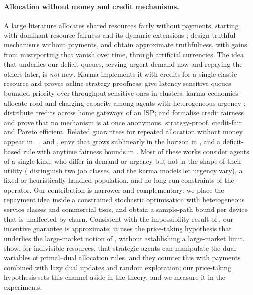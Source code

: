 \paragraph{Allocation without money and credit mechanisms.}
A large literature allocates shared resources fairly without payments, starting with dominant resource fairness \citep{ghodsi2011dominant} and its dynamic extensions \citep{kash2014no,freeman2018dynamic,fikioris2021incentives}; \citet{cole2013mechanism} design truthful mechanisms without payments, and \citet{gorokh2021monetary} obtain approximate truthfulness, with gains from misreporting that vanish over time, through artificial currencies.
The idea that underlies our deficit queues, serving urgent demand now and repaying the others later, is \emph{not} new.
Karma \citep{vuppalapati2023karma} implements it with credits for a single elastic resource and proves online strategy-proofness; \citet{le2019bopf} give latency-sensitive queues bounded priority over throughput-sensitive ones in clusters; karma economies allocate road and charging capacity among agents with heterogeneous urgency \citep{elokda2024karma,elokda2025carma,elokda2026ev}; \citet{wong2013myob} distribute credits across home gateways of an ISP; and \citet{zahedi2026credit} formalise credit fairness and prove that no mechanism is at once anonymous, strategy-proof, credit-fair and Pareto efficient.
Related guarantees for repeated allocation without money appear in \citet{balseiro2019nomoney}, \citet{banerjee2023pseudo}, \citet{fikioris2025dmmf} and \citet{lin2026spec}, envy that grows sublinearly in the horizon in \citet{benade2018envy}, and a deficit-based rule with anytime fairness bounds in \citet{kahana2026perpetual}.
Most of these works consider agents of a single kind, who differ in demand or urgency but not in the shape of their utility (\citet{le2019bopf} distinguish two job classes, and the karma models let urgency vary), a fixed or heuristically handled population, and no long-run constraints of the operator.
Our contribution is narrower and complementary: we place the repayment idea inside a constrained stochastic optimisation with heterogeneous service classes and commercial tiers, and obtain a sample-path bound per device that is unaffected by churn.
Consistent with the impossibility result of \citet{zahedi2026credit}, our incentive guarantee is approximate; it uses the price-taking hypothesis that underlies the large-market notion of \citet{azevedo2019strategy}, without establishing a large-market limit.
\citet{dai2025efficiency} show, for indivisible resources, that strategic agents can manipulate the dual variables of primal--dual allocation rules, and they counter this with payments combined with lazy dual updates and random exploration; our price-taking hypothesis sets this channel aside in the theory, and we measure it in the experiments.

